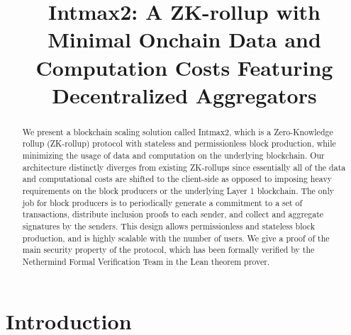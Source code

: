 \documentclass[runningheads]{llncs}
\begin{document}
%
\title{
Intmax2: A ZK-rollup with Minimal Onchain Data and Computation Costs Featuring Decentralized Aggregators
}
%
%
\author{}


\institute{}
%
\maketitle              %
%
\begin{abstract}
We present a blockchain scaling solution called Intmax2, which is a Zero-Knowledge rollup (ZK-rollup) protocol with stateless and permissionless block production, while minimizing the usage of data and computation on the underlying blockchain. Our architecture distinctly diverges from existing ZK-rollups since essentially all of the data and computational costs are shifted to the client-side as opposed to imposing heavy requirements on the block producers or the underlying Layer 1 blockchain. The only job for block producers is to periodically generate a commitment to a set of transactions, distribute inclusion proofs to each sender, and collect and aggregate signatures by the senders. This design allows permissionless and stateless block production, and is highly scalable with the number of users. We give a proof of the main security property of the protocol, which has been formally verified by the Nethermind Formal Verification Team in the Lean theorem prover.
\end{abstract}
%
%
%

\section{Introduction}
    

%     
\end{document}
